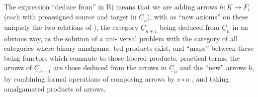 
The expression ``deduce from'' in B)  means that we are adding arrows
$h: K \to F_i$ (each with preassigned source and target in $\underline{C}_n$),  with as
``new axioms'' on  these uniquely the two relations  of ), the category
$\underline{C}_{n+1}$  being deduced from $\underline{C}_n$ in an obvious way,  as the solution of a uni-%
versal problem with the category of all categories where binary amalgama-%
ted products exist,  and ``maps'' between these being functors which commute
to those fibered products.  practical terms,  the arrows of $\underline{C}_{n+1}$ are
those deduced from the arrows in $\underline{C}_n$ and the ``new'' arrows $h$,  by combining
formal operations of composing arrows by $v\circ u$ ,  and taking  amalgamated
products of arrows. 

